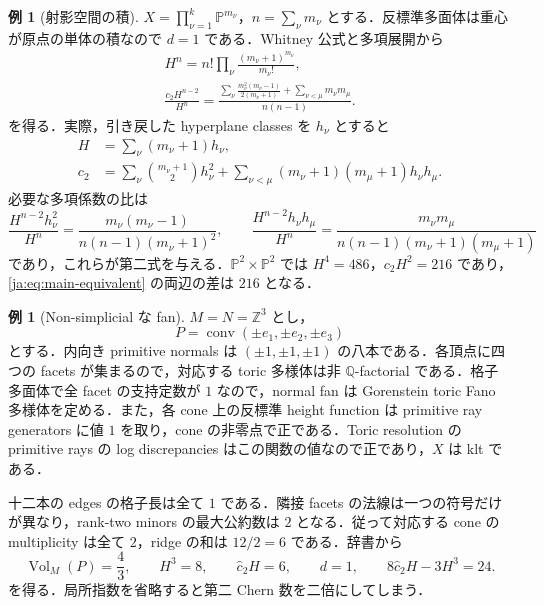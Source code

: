 \documentclass[12pt]{amsart}
\theoremstyle{definition}
\theoremstyle{remark}
\numberwithin{equation}{section}
\theoremstyle{plain}
\theoremstyle{definition}
\newtheorem{jeg}[thm]{例}
\theoremstyle{remark}
\begin{document}
\begin{jeg}[射影空間の積]\label{ja:ex:products}
$X=\prod_{\nu=1}^k\mathbb P^{m_\nu}$，$n=\sum_\nu m_\nu$ とする．反標準多面体は重心が原点の単体の積なので $d=1$ である．Whitney 公式と多項展開から
\begin{equation}\label{ja:eq:product}
 \begin{gathered}
 H^n=n!\prod_\nu\frac{(m_\nu+1)^{m_\nu}}{m_\nu!},\\
 \frac{c_2H^{n-2}}{H^n}
 =\frac{\displaystyle
   \sum_\nu\frac{m_\nu^2(m_\nu-1)}{2(m_\nu+1)}
   +\sum_{\nu<\mu}m_\nu m_\mu}{n(n-1)}.
 \end{gathered}
\end{equation}
を得る．実際，引き戻した hyperplane classes を $h_\nu$ とすると
\[
\begin{aligned}
H&=\sum_\nu(m_\nu+1)h_\nu,\\
c_2&=\sum_\nu\binom{m_\nu+1}{2}h_\nu^2
+\sum_{\nu<\mu}(m_\nu+1)(m_\mu+1)h_\nu h_\mu.
\end{aligned}
\]
必要な多項係数の比は
\[
\frac{H^{n-2}h_\nu^2}{H^n}
=\frac{m_\nu(m_\nu-1)}{n(n-1)(m_\nu+1)^2},
\qquad
\frac{H^{n-2}h_\nu h_\mu}{H^n}
=\frac{m_\nu m_\mu}{n(n-1)(m_\nu+1)(m_\mu+1)}
\]
であり，これらが第二式を与える．$\mathbb P^2\times\mathbb P^2$ では $H^4=486$，$c_2H^2=216$ であり，\eqref{ja:eq:main-equivalent} の両辺の差は $216$ となる．
\end{jeg}

\begin{jeg}[Non-simplicial な fan]\label{ja:ex:nonsimplicial}
$M=N=\mathbb Z^3$ とし，
\[P=\operatorname{conv}(\pm e_1,\pm e_2,\pm e_3)\]
とする．内向き primitive normals は $(\pm1,\pm1,\pm1)$ の八本である．各頂点に四つの facets が集まるので，対応する toric 多様体は非 $\mathbb Q$-factorial である．格子多面体で全 facet の支持定数が $1$ なので，normal fan は Gorenstein toric Fano 多様体を定める．また，各 cone 上の反標準 height function は primitive ray generators に値 $1$ を取り，cone の非零点で正である．Toric resolution の primitive rays の log discrepancies はこの関数の値なので正であり，$X$ は klt である．

十二本の edges の格子長は全て $1$ である．隣接 facets の法線は一つの符号だけが異なり，rank-two minors の最大公約数は $2$ となる．従って対応する cone の multiplicity は全て $2$，ridge の和は $12/2=6$ である．辞書から
\begin{equation}\label{ja:eq:octahedron}
 \operatorname{Vol}_M(P)=\frac43,\qquad
 H^3=8,\qquad \widehat c_2H=6,\qquad d=1,\qquad
 8\widehat c_2H-3H^3=24.
\end{equation}
を得る．局所指数を省略すると第二 Chern 数を二倍にしてしまう．
\end{jeg}
\end{document}
